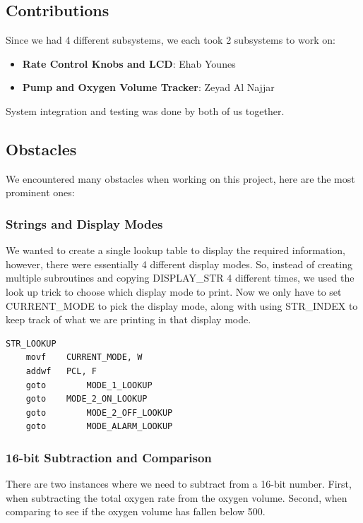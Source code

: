 \documentclass[a4paper, 12pt]{article}
\begin{document}
\subsection{Contributions}
\par Since we had 4 different subsystems, we each took 2 subsystems to work on:
\begin{itemize}
  \item \textbf{Rate Control Knobs and LCD}: Ehab Younes
  \item \textbf{Pump and Oxygen Volume Tracker}: Zeyad Al Najjar
\end{itemize}

\par System integration and testing was done by both of us together.

\subsection{Obstacles}
We encountered many obstacles when working on this project, here are the most prominent ones:

\subsubsection{Strings and Display Modes}
We wanted to create a single lookup table to display the required information, however, there were essentially 4 different display modes. So, instead of creating multiple subroutines and copying DISPLAY\_STR 4 different times, we used the look up trick to choose which display mode to print. Now we only have to set CURRENT\_MODE to pick the display mode, along with using STR\_INDEX to keep track of what we are printing in that display mode.


\begin{lstlisting}
STR_LOOKUP
    movf	CURRENT_MODE, W
    addwf	PCL, F
    goto    	MODE_1_LOOKUP
    goto   	MODE_2_ON_LOOKUP
    goto    	MODE_2_OFF_LOOKUP
    goto    	MODE_ALARM_LOOKUP
\end{lstlisting}


\subsubsection{16-bit Subtraction and Comparison}
There are two instances where we need to subtract from a 16-bit number. First, when subtracting the total oxygen rate from the oxygen volume. Second, when comparing to see if the oxygen volume has fallen below 500. \\
\end{document}
